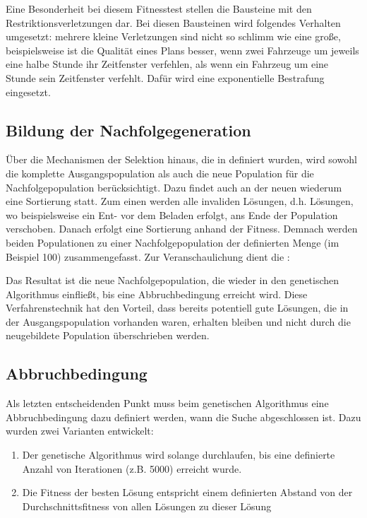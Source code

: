 Eine Besonderheit bei diesem Fitnesstest stellen die Bausteine mit den Restriktionsverletzungen dar. Bei diesen Bausteinen wird folgendes Verhalten umgesetzt: mehrere kleine Verletzungen sind nicht so schlimm wie eine große, beispielsweise ist die Qualität eines Plans besser, wenn zwei Fahrzeuge um jeweils eine halbe Stunde ihr Zeitfenster verfehlen, als wenn ein Fahrzeug um eine Stunde sein Zeitfenster verfehlt. Dafür wird eine exponentielle Bestrafung eingesetzt.

\subsection{Bildung der Nachfolgegeneration}
\label{sec:Nachfolgegeneration}
Über die Mechanismen der Selektion hinaus, die in  definiert wurden, wird sowohl die komplette Ausgangspopulation als auch die neue Population für die Nachfolgepopulation berücksichtigt. Dazu findet auch an der neuen wiederum eine Sortierung statt. Zum einen werden alle invaliden Lösungen, d.h. Lösungen, wo beispielsweise ein Ent- vor dem Beladen erfolgt, ans Ende der Population verschoben. Danach erfolgt eine Sortierung anhand der Fitness. Demnach werden beiden Populationen zu einer Nachfolgepopulation der definierten Menge (im Beispiel 100) zusammengefasst. Zur Veranschaulichung dient die :


Das Resultat ist die neue Nachfolgepopulation, die wieder in den genetischen Algorithmus einfließt, bis eine Abbruchbedingung erreicht wird. Diese Verfahrenstechnik hat den Vorteil, dass bereits potentiell gute Lösungen, die in der Ausgangspopulation vorhanden waren, erhalten bleiben und nicht durch die neugebildete Population überschrieben werden.

\FloatBarrier
\subsection{Abbruchbedingung}
Als letzten entscheidenden Punkt muss beim genetischen Algorithmus eine Abbruchbedingung dazu definiert werden, wann die Suche abgeschlossen ist. Dazu wurden zwei Varianten entwickelt:

\begin{enumerate}
 \item Der genetische Algorithmus wird solange durchlaufen, bis eine definierte Anzahl von Iterationen (z.B. 5000) erreicht wurde.
 \item Die Fitness der besten Lösung entspricht einem definierten Abstand von der Durchschnittsfitness von allen Lösungen zu dieser Lösung
\end{enumerate}

